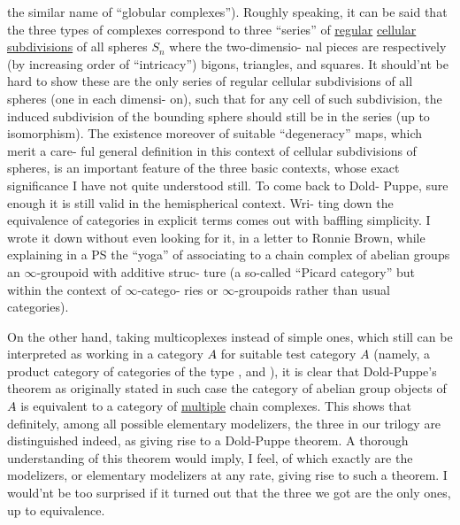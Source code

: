 the similar name of ``globular complexes''). Roughly speaking, it can be
said that the three types of complexes correspond to three ``series'' of
\uline{regular} \uline{cellular} \uline{subdivisions} of all spheres $S_n$  where the two-dimensio-%
nal pieces are respectively (by increasing order of ``intricacy'') bigons,
triangles, and squares. It should'nt be hard to show these are the only
series of regular cellular subdivisions of all spheres (one in each dimensi-%
on), such that for any cell of such subdivision, the induced subdivision
of the bounding sphere should still be in the series (up to isomorphism).
The existence moreover of suitable ``degeneracy'' maps, which merit a care-%
ful general definition in this context of cellular subdivisions of spheres,
is an important   feature of the three basic contexts, whose exact
significance I have not quite understood still.  To come back to Dold-%
Puppe, sure enough it is still valid in the hemispherical context. Wri-%
ting down the equivalence of categories in explicit terms comes out with
baffling simplicity. I wrote it down without even looking for it, in a
letter to Ronnie Brown, while explaining in a PS the ``yoga'' of associating
to a chain complex of abelian groups an $\infty$-groupoid with additive struc-%
ture (a so-called ``Picard category'' but within the context of $\infty$-catego-%
ries or $\infty$-groupoids\hand{,} rather than usual categories).

On the other hand, taking multicoplexes instead of simple ones, 
which still can be interpreted as working in a category $A\hat{}$ for suitable
test category $A$ (namely, a product category of categories of the type
\hand{$\Box$}, \hand{$\triangle$} and \hand{$\Diamond$}), it is clear that Dold-Puppe's theorem 
as originally stated\hand{\unsure{,}}  in such case the category of abelian group objects
of $A\hat{}$ is equivalent to a category of \uline{multiple} chain complexes. This shows
that definitely, among all possible elementary modelizers, the three in
our trilogy are distinguished indeed, as giving rise to a Dold-Puppe
theorem. A thorough understanding of this theorem would imply, I feel,
 of which exactly are the modelizers, or elementary modelizers at any rate,
giving rise to such a theorem. I would'nt be too surprised if it turned
out that the three we got are the only ones, up to equivalence.

